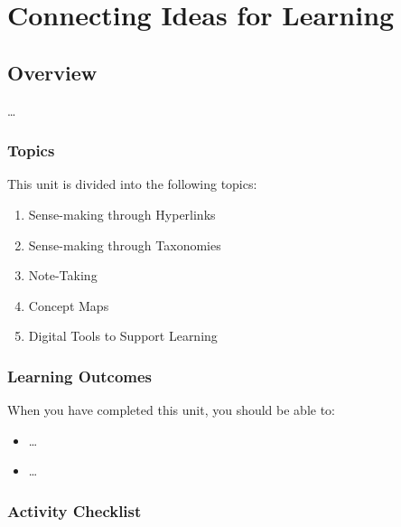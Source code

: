 \documentclass[
]{book}
\providecommand{\tightlist}{%
  \setlength{\itemsep}{0pt}\setlength{\parskip}{0pt}}
\theoremstyle{definition}
\theoremstyle{definition}
\theoremstyle{definition}
\theoremstyle{definition}
\theoremstyle{remark}
\begin{document}
\hypertarget{connecting-ideas-for-learning}{%
\chapter{Connecting Ideas for Learning}\label{connecting-ideas-for-learning}}

\hypertarget{overview-2}{%
\section*{Overview}\label{overview-2}}

\ldots{}

\hypertarget{topics-2}{%
\subsection*{Topics}\label{topics-2}}

This unit is divided into the following topics:

\begin{enumerate}
\def\labelenumi{\arabic{enumi}.}
\tightlist
\item
  Sense-making through Hyperlinks
\item
  Sense-making through Taxonomies
\item
  Note-Taking
\item
  Concept Maps
\item
  Digital Tools to Support Learning
\end{enumerate}

\hypertarget{learning-outcomes-2}{%
\subsection*{Learning Outcomes}\label{learning-outcomes-2}}

When you have completed this unit, you should be able to:

\begin{itemize}
\tightlist
\item
  \ldots{}
\item
  \ldots{}
\end{itemize}

\hypertarget{activity-checklist-2}{%
\subsection*{Activity Checklist}\label{activity-checklist-2}}
\end{document}
